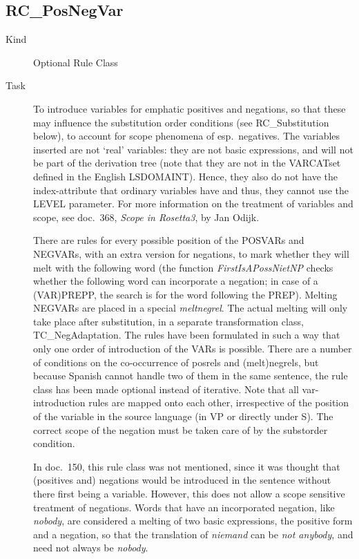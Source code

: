 \subsection{RC\_PosNegVar}
\begin{description}
\item[Kind] Optional Rule Class
\item[Task] To introduce variables for emphatic positives and negations, so 
that these may influence the substitution order conditions (see 
RC\_Substitution below), to account for scope phenomena of esp.\ negatives.
The variables inserted are not `real' variables: they are not basic expressions, 
and will not be part of the derivation tree (note that they are not in the 
VARCATset defined in the English LSDOMAINT). Hence, they also do not have the
index-attribute that ordinary variables have and thus, they cannot use the 
LEVEL parameter. For more information on the 
treatment of variables and scope, see doc.\ 368, {\em Scope in Rosetta3\/}, 
by Jan Odijk.

There are rules for every possible position of the POSVARs and NEGVARs, 
with an extra version for negations, to mark whether they will melt with the 
following word (the function {\em FirstIsAPossNietNP\/} checks whether the 
following 
word can incorporate a negation; in case of a (VAR)PREPP, the search is for 
the word following the PREP). Melting NEGVARs are placed in a special {\em 
meltnegrel\/}. The actual melting will only take place after substitution, in a 
separate transformation class, TC\_NegAdaptation.
The rules have been formulated in such a way that only one order of 
introduction of the VARs is possible. There are a number of conditions on the 
co-occurrence of posrels and (melt)negrels, but because Spanish cannot handle 
two of them in the same sentence, the rule class has been made optional 
instead of 
iterative. Note that all var-introduction rules are mapped onto each other, 
irrespective of the position of the variable in the source language (in VP or 
directly under S). The correct scope of the negation must be taken care of by 
the substorder condition.

In doc.\ 150, this rule class was not mentioned, since it was thought that 
(positives and) negations would be introduced in the sentence without there 
first being a variable. However, this does not allow a scope sensitive 
treatment of negations. Words that have an incorporated 
negation, like {\em nobody\/}, are considered a melting of two basic 
expressions, the positive form and a negation, so that the translation of {\em 
niemand\/} can be {\em not anybody\/}, and need not always be {\em nobody\/}.


\end{description}
